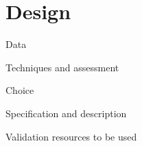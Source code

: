 \chapter{Design}

Data

Techniques and assessment

Choice

Specification and description

Validation resources to be used